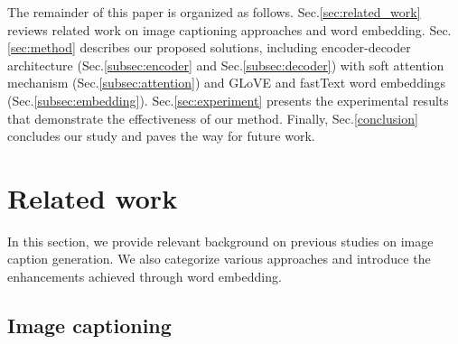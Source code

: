 \documentclass[conference]{IEEEtran}
\begin{document}
The remainder of this paper is organized as follows. Sec.\ref{sec:related_work} reviews related work on image captioning approaches and word embedding. Sec.\ref{sec:method} describes our proposed solutions, including encoder-decoder architecture (Sec.\ref{subsec:encoder} and Sec.\ref{subsec:decoder}) with soft attention mechanism (Sec.\ref{subsec:attention}) and GLoVE and fastText word embeddings (Sec.\ref{subsec:embedding}). Sec.\ref{sec:experiment} presents the experimental results that demonstrate the effectiveness of our method. Finally, Sec.\ref{conclusion} concludes our study and  paves the way for future work.


\section{Related work \label{sec:related_work}}
In this section, we provide relevant background on previous studies on image caption generation. We also categorize various approaches and introduce the enhancements achieved through word embedding.


\subsection{Image captioning}
\end{document}
